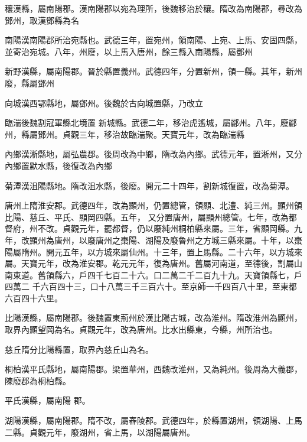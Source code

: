 \begin{pinyinscope}
 穰漢縣，屬南陽郡。漢南陽郡以宛為理所，後魏移治於穰。隋改為南陽郡，尋改為鄧州，取漢鄧縣為名



 南陽漢南陽郡所治宛縣也。武德三年，置宛州，領南陽、上宛、上馬、安固四縣，並寄治宛城。八年，州廢，以上馬入唐州，餘三縣入南陽縣，屬鄧州



 新野漢縣，屬南陽郡。晉於縣置義州。武德四年，分置新州，領一縣。其年，新州廢，縣屬鄧州



 向城漢西鄂縣地，屬鄧州。後魏於古向城置縣，乃改立



 臨湍後魏割冠軍縣北境置
 新城縣。武德二年，移治虎遙城，屬酈州。八年，廢酈州，縣屬鄧州。貞觀三年，移治故臨湍聚。天寶元年，改為臨湍縣



 內鄉漢淅縣地，屬弘農郡。後周改為中鄉，隋改為內鄉。武德元年，置淅州，又分內鄉置默水縣，後復改為內鄉



 菊潭漢沮陽縣地。隋改沮水縣，後廢。開元二十四年，割新城復置，改為菊潭。



 唐州上隋淮安郡。武德四年，改為顯州，仍置總管，領顯、北澧、純三州。顯州領比陽、慈丘、平氏、顯岡四縣。五年，
 又分置唐州，屬顯州總管。七年，改為都督府，州不改。貞觀元年，罷都督，仍以廢純州桐柏縣來屬。三年，省顯岡縣。九年，改顯州為唐州，以廢唐州之棗陽、湖陽及廢魯州之方城三縣來屬。十年，以棗陽屬隋州。開元五年，以方城來屬仙州。十三年，置上馬縣。二十六年，以方城來屬。天寶元年，改為淮安郡。乾元元年，復為唐州。舊屬河南道，至德後，割屬山南東道。舊領縣六，戶四千七百二十六。口二萬二千二百九十九。天寶領縣七，戶四萬二
 千六百四十三，口十八萬三千三百六十。至京師一千四百八十里，至東都六百四十六里。



 比陽漢縣，屬南陽郡。後魏置東荊州於漢比陽古城，改為淮州。隋改淮州為顯州，取界內顯望岡為名。貞觀元年，改為唐州。比水出縣東，今縣，州所治也。



 慈丘隋分比陽縣置，取界內慈丘山為名。



 桐柏漢平氏縣地，屬南陽郡。梁置華州，西魏改淮州，又為純州。後周為大義郡，陳廢郡為桐柏縣。



 平氏漢縣，屬南陽
 郡。



 湖陽漢縣，屬南陽郡。隋不改，屬舂陵郡。武德四年，於縣置湖州，領湖陽、上馬二縣。貞觀元年，廢湖州，省上馬，以湖陽屬唐州。




\end{pinyinscope}
